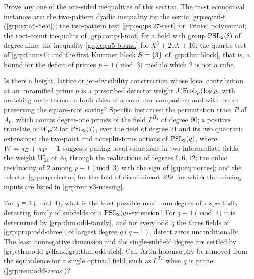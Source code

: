 \begin{problem}\label{grp:prob:inequalities}
Prove any one of the one-sided inequalities of this section. The most
economical instances are: the two-pattern dyadic inequality for the sextic
\eqref{grp:eq:a6-f} (\cref{grp:ex:a6-field}); the two-pattern test
\eqref{grp:eq:psl27-test} for Trinks' polynomial; the root-count inequality of
\cref{grp:cor:psl-root} for a field with group $\operatorname{PSL}_2(8)$ of degree nine; the
inequality \eqref{grp:eq:a5-bound} for $X^5+20X+16$; the quartic test of
\cref{grp:thm:s4}; and the first Kummer block $S=\{3\}$ of
\cref{grp:thm:block}, that is, a bound for the deficit of primes
$p\equiv1\pmod3$ modulo which $2$ is not a cube.
\end{problem}

\begin{question}\label{grp:q:carrier}
Is there a height, lattice or jet-divisibility construction whose local
contribution at an unramified prime $p$ is a prescribed detector weight
$J(\operatorname{Frob}_p)\log p$, with matching main terms on both sides of a covolume
comparison and with errors preserving the square-root saving? Specific
instances: the permutation trace $P$ of $A_6$, which counts degree-one primes
of the field $L^{H_4}$ of degree $90$; a positive translate of $W_P/2$ for
$\operatorname{PSL}_2(7)$, over the field of degree $21$ and its two quadratic extensions;
the two-point and nonsplit-torus actions of $\operatorname{PSL}_2(q)$, where
$W=\pi_B+\pi_{T'}-\mathbf{1}$ suggests pairing local valuations in two intermediate
fields; the weight $W_{21}$ of $A_5$ through the realizations of degrees
$5,6,12$; the cubic residuacity of $2$ among $p\equiv1\pmod3$ with the sign of
\eqref{grp:eq:nonres}; and the selector \eqref{grp:eq:selector} for the field
of discriminant $229$, for which the missing inputs are listed in
\cref{grp:rem:s3-missing}.
\end{question}

\begin{question}\label{grp:q:odd}
For $q\equiv3\pmod4$, what is the least possible maximum degree of a spectrally
detecting family of subfields of a $\operatorname{PSL}_2(q)$-extension? For $q\equiv1\pmod4$
it is determined by \cref{grp:thm:odd-family}, and for every odd $q$ the
three fields of \cref{grp:prop:odd-three}, of largest degree $q(q-1)$, detect
zeros unconditionally. The least nonnegative dimension and the single-subfield
degree are settled by \cref{grp:thm:odd-gelfand,grp:thm:odd-rich}. Can Artin
holomorphy be removed from the equivalence for a single optimal field, such as
$L^{T_n}$ when $q$ is prime (\cref{grp:rem:odd-zeros})?
\end{question}

